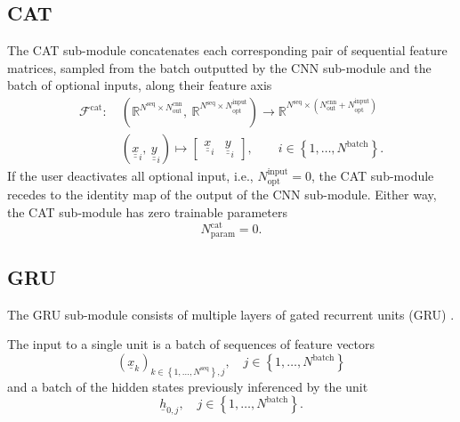 \subsection*{CAT}
The CAT sub-module concatenates
each corresponding pair of sequential feature matrices,
sampled from 
the
batch outputted by the CNN sub-module
and the batch of optional inputs,
along their feature axis
\begin{align} \label{eq:cat}
    \mathcal{F}^\text{cat}
    :\ 
    & \left(
        \mathbb{R}^{
            N^\text{seq}
            \times
            N^\text{cnn}_{\text{out}}
        }
        ,\ 
        \mathbb{R}^{
            N^\text{seq}
            \times
            N^\text{input}_{\text{opt}}
        }
    \right)
    \rightarrow 
    \mathbb{R}^{
            N^\text{seq}
            \times
            \left(
                N^\text{cnn}_{\text{out}}
                + 
                N^\text{input}_{\text{opt}}
            \right)
        }
    \nonumber \\ &
    \left(
        \underline{\underline{x}}_{i}
        ,\ 
        \underline{\underline{y}}_{i}
    \right)
    \mapsto
    \begin{bmatrix}
        \underline{\underline{x}}_{i} & \underline{\underline{y}}_{i}
    \end{bmatrix} 
    ,\qquad
    i \in \left\{
        1, \dots, N^\text{batch}
    \right\}.
\end{align}
If the user deactivates all optional input, i.e.,
$
    N^\text{input}_{\text{opt}} = 0
$,
the CAT sub-module recedes to 
the identity map
of the output of the CNN sub-module.
Either way, 
the CAT sub-module has zero trainable parameters
\begin{equation}
    N^\text{cat}_\text{param} = 0.
\end{equation}


\subsection*{GRU}
The GRU sub-module consists of multiple layers of 
gated recurrent units (GRU) \cite{Cho2014}.

The input to a single unit is
a batch of sequences of feature vectors
\begin{equation}
    \left(
        \underline x_k
    \right)_{
        k \in \left\{
            1, \dots, N^\text{seq}
        \right\}
        ,
        j
    }
    ,\quad
    j \in \left\{
        1, \dots, N^\text{batch}
    \right\}
\end{equation}
and a batch of the hidden states
previously inferenced by the unit
\begin{equation}
    \underline h_{0,j}
    ,\quad
    j \in \left\{
        1, \dots, N^\text{batch}
    \right\}.
\end{equation}


